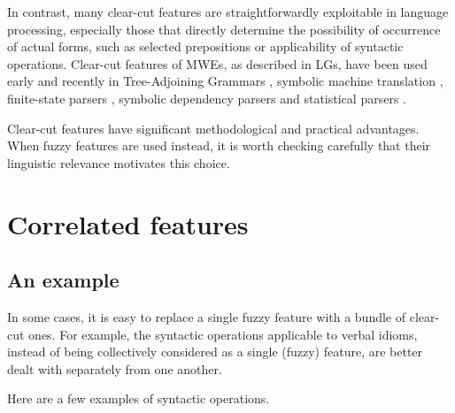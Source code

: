 \documentclass[output=paper]{langsci/langscibook}
\begin{document}
In contrast, many clear-cut features are straightforwardly exploitable in language processing, especially those that directly determine the possibility of occurrence of actual forms, such as selected prepositions or applicability of syntactic operations. Clear-cut features of MWEs, as described in LGs, have been used early and recently in  Tree-Adjoining Grammars \citep{Abeille88}, symbolic machine translation \citep{Danlos1992}, finite-state parsers \citep{Senellart1998}, symbolic dependency parsers \citep{Tolone2011} and statistical parsers \citep{Constant}. 

Clear-cut features have significant methodological and practical advantages. When fuzzy features are used instead, it is worth checking carefully that their linguistic relevance motivates this choice.

\section{Correlated features}
\label{sec:3}

\label{correlatedfeatures}

\subsection{An example} 

In some cases, it is easy to replace a single fuzzy feature with a bundle of clear-cut ones. For example, the syntactic operations applicable to verbal idioms, instead of being collectively considered as a single (fuzzy) feature, are better dealt with separately from one another.

Here are a few examples of syntactic operations.
\end{document}
